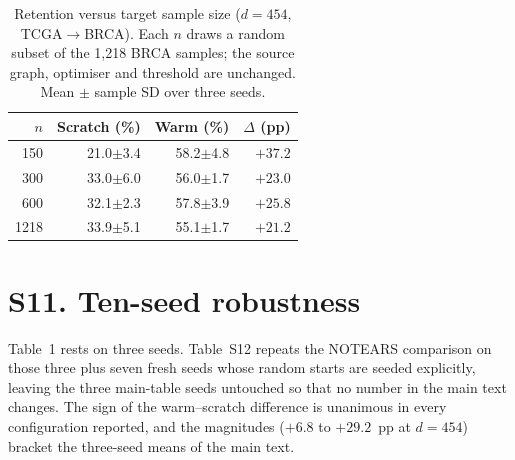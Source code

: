 \documentclass[11pt]{article}
\renewcommand{\to}{\ensuremath{\rightarrow}\allowbreak}
\begin{document}
\setcounter{table}{10}
\begin{table}[h]
\caption{Retention versus target sample size ($d=454$, TCGA$\to$BRCA). Each $n$ draws a random subset of the 1{,}218 BRCA samples; the source graph, optimiser and threshold are unchanged. Mean $\pm$ sample SD over three seeds.}
\begin{tabular}{@{}rrrr@{}}
\toprule
$n$ & Scratch (\%) & Warm (\%) & $\Delta$ (pp)\\
\midrule
150 & 21.0$\pm$3.4 & 58.2$\pm$4.8 & $+37.2$\\
300 & 33.0$\pm$6.0 & 56.0$\pm$1.7 & $+23.0$\\
600 & 32.1$\pm$2.3 & 57.8$\pm$3.9 & $+25.8$\\
1218 & 33.9$\pm$5.1 & 55.1$\pm$1.7 & $+21.2$\\
\bottomrule
\end{tabular}
\label{tab:S11}
\end{table}

\section*{S11. Ten-seed robustness}

Table~1 rests on three seeds. Table~S12 repeats the NOTEARS comparison on those three plus
seven fresh seeds whose random starts are seeded explicitly, leaving the three main-table
seeds untouched so that no number in the main text changes. The sign of the warm--scratch
difference is unanimous in every configuration reported, and the magnitudes ($+6.8$ to
$+29.2$~pp at $d=454$) bracket the three-seed means of the main text.
\end{document}
